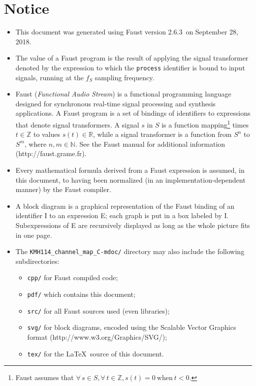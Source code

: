 \documentclass{article}
\newcommand{\faustdocdir}{KMH114\_channel\_map\_C-mdoc}
\newcommand{\faustversion}{2.6.3}
\newcommand{\faustdocdate}{September 28, 2018}
\begin{document}
 \section{Notice} \label{notice}  
\begin{itemize}
	\item This document was generated using Faust version \faustversion\ on \faustdocdate.
	\item The value of a Faust program is the result of applying the signal transformer denoted by the expression to which the \texttt{process} identifier is bound to input signals, running at the $f_S$ sampling frequency.
	\item Faust (\emph{Functional Audio Stream}) is a functional programming language designed for synchronous real-time signal processing and synthesis applications. A Faust program is a set of bindings of identifiers to expressions that denote signal transformers. A signal $s$ in $S$ is a function mapping\footnote{Faust assumes that $\forall \, s \in S, \forall \, t \in \mathbb{Z}, s(t) = 0 \mathrm{\ when\ } t < 0$.} times $t \in \mathbb{Z}$ to values $s(t) \in \mathbb{R}$, while a signal transformer is a function from $S^n$ to $S^m$, where $n,m\in \mathbb{N}$. See the Faust manual for additional information (\textsf{http://faust.grame.fr}).
	\item Every mathematical formula derived from a Faust expression is assumed, in this document, to having been normalized (in an implementation-depen\-dent manner) by the Faust compiler.
	\item A block diagram is a graphical representation of the Faust binding of an identifier I to an expression E; each graph is put in a box labeled by I. Subexpressions of E are recursively displayed as long as the whole picture fits in one page.
	\item The \texttt{\faustdocdir/} directory may also include the following subdirectories:
\begin{itemize}
	\item	\texttt{cpp/} for Faust compiled code; 
	\item	\texttt{pdf/} which contains this document; 
	\item	\texttt{src/} for all Faust sources used (even libraries); 
	\item	\texttt{svg/} for block diagrams, encoded using the Scalable Vector Graphics format (\textsf{http://www.w3.org/Graphics/SVG/});
	\item	\texttt{tex/} for the \LaTeX\ source of this document.
\end{itemize}
\end{itemize}
\end{document}

